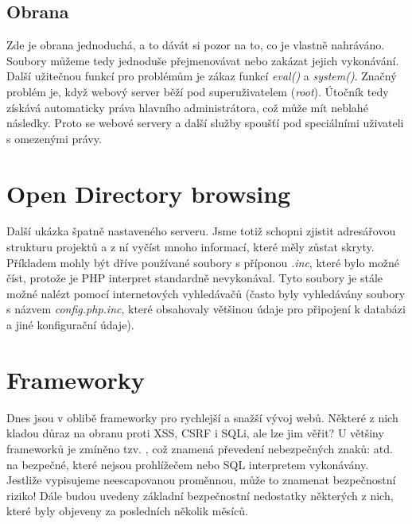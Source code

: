 \documentclass[12pt, a4paper]{report}
\begin{document}
\subsection{Obrana}
Zde je obrana jednoduchá, a to dávát si pozor na to, co je vlastně nahráváno. Soubory můžeme tedy jednoduše přejmenovávat nebo zakázat jejich vykonávání. Další užitečnou funkcí pro  problémům je zákaz funkcí \textit{eval()} a \textit{system()}. Značný problém je, když webový server běží pod superuživatelem (\textit{root}). Útočník tedy získává automaticky práva hlavního administrátora, což může mít neblahé následky. Proto se webové servery a další služby spoušťí pod speciálními uživateli s omezenými právy.

\section{Open Directory browsing}
Další ukázka špatně nastaveného serveru. Jsme totiž schopni zjistit adresářovou strukturu projektů a z ní vyčíst mnoho informací, které měly zůstat skryty. Příkladem mohly být dříve používané soubory s příponou \textit{.inc}, které bylo možné číst, protože je PHP interpret standardně nevykonával. Tyto soubory je stále možné nalézt pomocí internetových vyhledávačů (často byly vyhledávány soubory s názvem \textit{config.php.inc}, které obsahovaly většinou údaje pro připojení k databázi a jiné konfigurační údaje).

\section{Frameworky}
Dnes jsou v oblibě frameworky pro rychlejší a snažší vývoj webů. Některé z nich kladou důraz na obranu proti XSS, CSRF i SQLi, ale lze jim věřit? U většiny frameworků je zmíněno tzv. , což znamená převedení nebezpečných znaků: \uv{<>\"} atd. na bezpečné, které nejsou prohlížečem nebo SQL interpretem vykonávány. Jestliže vypisujeme neescapovanou proměnnou, může to znamenat bezpečnostní riziko! Dále budou uvedeny základní bezpečnostní nedostatky některých z nich, které byly objeveny za posledních několik měsíců.
\end{document}
